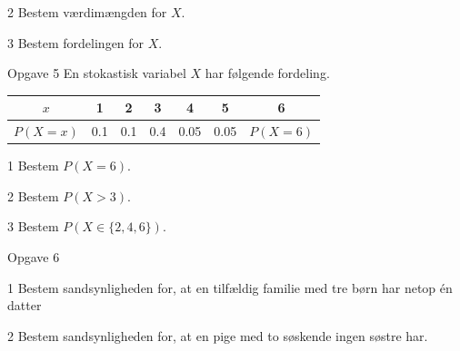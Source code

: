 \documentclass[12pt,x11names,a4paper]{article}
\begin{document}
\begin{delopgave}{}{2}
	Bestem værdimængden for $X$.
\end{delopgave}
\begin{delopgave}{}{3}
	Bestem fordelingen for $X$.
\end{delopgave}

\begin{opgavetekst}{Opgave 5}
	En stokastisk variabel $X$ har følgende fordeling.
	\begin{center}
		\vspace{0.5cm}
		\begin{tabular}{c|c|c|c|c|c|c}
			$x$ & 1 & 2 & 3 & 4 & 5 & 6 \\
			\hline
			$P(X = x)$ & 0.1 & 0.1 & 0.4 & 0.05 & 0.05 & $P(X = 6)$
		\end{tabular}
	\end{center}
	\phantom{h}
\end{opgavetekst}

\begin{delopgave}{}{1}
	Bestem $P(X = 6)$.
\end{delopgave}
\begin{delopgave}{}{2}
	Bestem $P(X > 3)$.
\end{delopgave}
\begin{delopgave}{}{3}
	Bestem $P(X \in \{2,4,6\})$.
\end{delopgave}

\begin{opgavetekst}{Opgave 6}
\end{opgavetekst}
\begin{delopgave}{}{1}
	Bestem sandsynligheden for, at en tilfældig familie med tre børn har netop én datter
\end{delopgave}
\begin{delopgave}{}{2}
	Bestem sandsynligheden for, at en pige med to søskende ingen søstre har. 
\end{delopgave}
\end{document}
